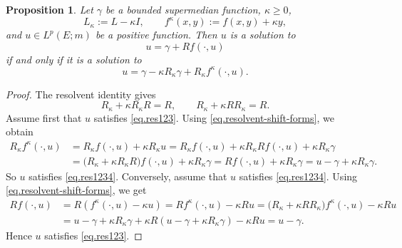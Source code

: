 \documentclass[11pt,a4paper,reqno]{amsart}
\newtheorem{proposition}[theorem]{\bf Proposition}
\theoremstyle{definition}
\numberwithin{equation}{section}
\begin{document}
\begin{proposition}
\label{prop.shifted-equation}
Let $\gamma$ be a bounded supermedian function,
$\kappa\geq 0$, 
\[
L_\kappa:=L-\kappa I,
\qquad
f^\kappa(x,y):=f(x,y)+\kappa y,
\]
and    $u\in L^p(E;m)$ be a positive function. Then  $u$ is a solution to
\begin{equation}
\label{eq.res123}
u=\gamma+Rf(\cdot,u)
\end{equation}
if and only if it is a solution to
\begin{equation}
\label{eq.res1234}
u=\gamma-\kappa R_\kappa\gamma+R_\kappa f^\kappa(\cdot,u).
\end{equation}
\end{proposition}

\begin{proof}
The resolvent identity gives
\begin{equation}\label{eq.resolvent-shift-forms}
R_\kappa+\kappa R_\kappa R=R,
\qquad
R_\kappa+\kappa RR_\kappa=R.
\end{equation}
Assume first that $u$ satisfies \eqref{eq.res123}. 
Using 
\eqref{eq.resolvent-shift-forms}, we obtain
\[
\begin{split}
R_\kappa f^\kappa(\cdot,u)&=R_\kappa f(\cdot,u)+\kappa R_\kappa u=R_\kappa f(\cdot,u)
+\kappa R_\kappa Rf(\cdot,u)+\kappa R_\kappa\gamma
\\&=\bigl(R_\kappa+\kappa R_\kappa R\bigr)f(\cdot,u)
+\kappa R_\kappa\gamma=Rf(\cdot,u)+\kappa R_\kappa\gamma=u-\gamma+\kappa R_\kappa\gamma.
\end{split}
\]
So $u$ satisfies \eqref{eq.res1234}. Conversely, assume that $u$ satisfies \eqref{eq.res1234}. 
Using 
\eqref{eq.resolvent-shift-forms}, we get
\[
\begin{split}
Rf(\cdot,u)
&=R(f^\kappa(\cdot,u)-\kappa u)=Rf^\kappa(\cdot,u)-\kappa Ru=
\bigl(R_\kappa+\kappa RR_\kappa\bigr)f^\kappa(\cdot,u)-\kappa Ru\\&
=u-\gamma+\kappa R_\kappa\gamma+\kappa R(u-\gamma+\kappa R_\kappa\gamma)-\kappa Ru=u-\gamma.
\end{split}
\]
Hence $u$ satisfies  \eqref{eq.res123}.
\end{proof}
\end{document}
